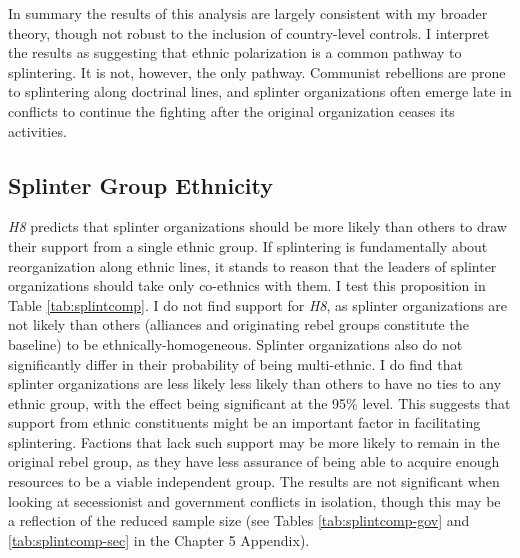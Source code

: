 \documentclass[12pt,]{book}
\theoremstyle{definition}
\theoremstyle{definition}
\theoremstyle{definition}
\theoremstyle{remark}
\begin{document}
In summary the results of this analysis are largely consistent with my
broader theory, though not robust to the inclusion of country-level
controls. I interpret the results as suggesting that ethnic polarization
is a common pathway to splintering. It is not, however, the only
pathway. Communist rebellions are prone to splintering along doctrinal
lines, and splinter organizations often emerge late in conflicts to
continue the fighting after the original organization ceases its
activities.

\hypertarget{splinter-group-ethnicity}{%
\subsection{Splinter Group Ethnicity}\label{splinter-group-ethnicity}}

\emph{H8} predicts that splinter organizations should be more likely
than others to draw their support from a single ethnic group. If
splintering is fundamentally about reorganization along ethnic lines, it
stands to reason that the leaders of splinter organizations should take
only co-ethnics with them. I test this proposition in Table
\ref{tab:splintcomp}. I do not find support for \emph{H8}, as splinter
organizations are not likely than others (alliances and originating
rebel groups constitute the baseline) to be ethnically-homogeneous.
Splinter organizations also do not significantly differ in their
probability of being multi-ethnic. I do find that splinter organizations
are less likely less likely than others to have no ties to any ethnic
group, with the effect being significant at the 95\% level. This
suggests that support from ethnic constituents might be an important
factor in facilitating splintering. Factions that lack such support may
be more likely to remain in the original rebel group, as they have less
assurance of being able to acquire enough resources to be a viable
independent group. The results are not significant when looking at
secessionist and government conflicts in isolation, though this may be a
reflection of the reduced sample size (see Tables
\ref{tab:splintcomp-gov} and \ref{tab:splintcomp-sec} in the Chapter 5
Appendix).
\end{document}
